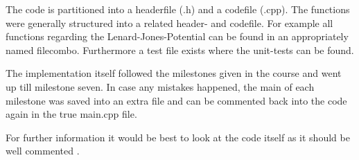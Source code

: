 The code is partitioned into a headerfile (.h) and a codefile (.cpp). The functions were generally structured into a related header- and codefile. For example all functions regarding the Lenard-Jones-Potential can be found in an appropriately named filecombo. Furthermore a test file exists where the unit-tests can be found.
\par
The implementation itself followed the milestones given in the course and went up till milestone seven. 
In case any mistakes happened, the main of each milestone was saved into an extra file and can be commented back into the code again in the true main.cpp file. 
\par
For further information it would be best to look at the code itself as it should be well commented \cite{molDymGithub}.




